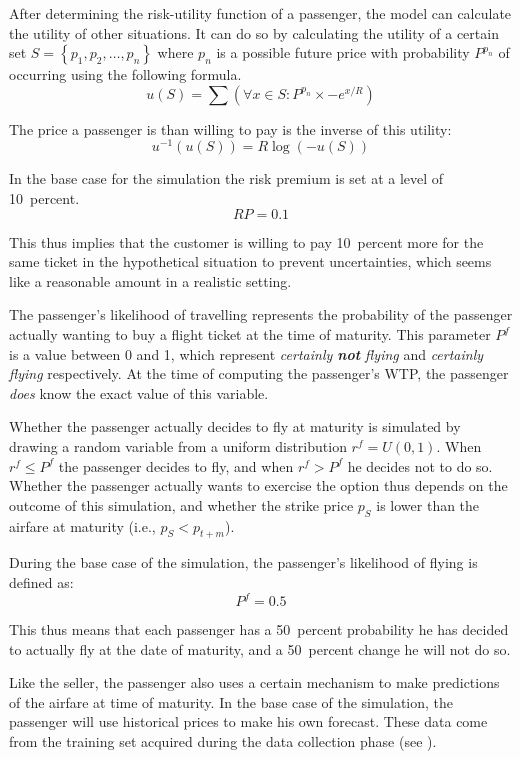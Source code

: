 After determining the risk-utility function of a passenger, the model can calculate the utility of other situations. It can do so by calculating the utility of a certain set $S = \left\{ p_1, p_2, \ldots, p_n\right\}$ where $p_n$ is a possible future price with probability $P^{p_n}$ of occurring using the following formula.
$$
u(S) = \sum (\forall x \in S: P^{p_n} \times -e^{x/R})
$$

The price a passenger is than willing to pay is the inverse of this utility:
$$
u^{-1}(u(S)) = R \log(-u(S))
$$

In the base case for the simulation the risk premium is set at a level of 10~percent. 
$$RP = 0.1$$

This thus implies that the customer is willing to pay 10~percent more for the same ticket in the hypothetical situation to prevent uncertainties, which seems like a reasonable amount in a realistic setting.


The passenger's likelihood of travelling represents the probability of the passenger actually wanting to buy a flight ticket at the time of maturity. This parameter $P^f$ is a value between 0 and 1, which represent \emph{certainly \textbf{not} flying} and \emph{certainly flying} respectively. At the time of computing the passenger's WTP, the passenger \emph{does} know the exact value of this variable.

Whether the passenger actually decides to fly at maturity is simulated by drawing a random variable from a uniform distribution $r^f = U(0,1)$. When $r^f \le P^f$ the passenger decides to fly, and when $r^f > P^f$ he decides not to do so. Whether the passenger actually wants to exercise the option thus depends on the outcome of this simulation, and whether the strike price $p_S$ is lower than the airfare at maturity (i.e., $p_S < p_{t+m}$).

During the base case of the simulation, the passenger's likelihood of flying is defined as:
$$P^f = 0.5$$

This thus means that each passenger has a 50~percent probability he has decided to actually fly at the date of maturity, and a 50~percent change he will not do so.


Like the seller, the passenger also uses a certain mechanism to make predictions of the airfare at time of maturity. In the base case of the simulation, the passenger will use historical prices to make his own forecast. These data come from the training set acquired during the data collection phase (see ).

